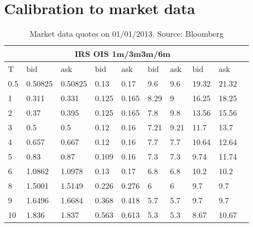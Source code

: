 \documentclass[12pt,a4paper]{article}
\theoremstyle{plain}
\numberwithin{equation}{section}
\begin{document}
\section{Calibration to market data}\label{calsec}
\begin{table}[t]
\begin{center}
\begin{tabular}{|l|l|l|l|l|l|l|l|l|l|}
\hline
\multicolumn{9}{|c|}{\;\;\;\;\;\;\;\;\;\;\;\;\;\;\;IRS \;\;\;\;\;\;\;\; \;\;\;\;\;\;\;\;\;\;\;\;OIS \;\;\;\;\;\;\;\;\;\;\;\;1m/3m\;\;\;\;\;\;\;\;\;\;\;\;\;3m/6m} \\\hline
T& bid& ask& bid& ask& bid& ask& bid& ask\\ \hline
0.5   & 0.50825 & 0.50825 & 0.13  & 0.17  & 9.6   & 9.6   & 19.32 & 21.32 \\
    1     & 0.311 & 0.331 & 0.125 & 0.165 & 8.29  & 9     & 16.25 & 18.25 \\
    2     & 0.37  & 0.395 & 0.125 & 0.165 & 7.8   & 9.8   & 13.56 & 15.56 \\
    3     & 0.5   & 0.5   & 0.12  & 0.16  & 7.21  & 9.21  & 11.7  & 13.7 \\
    4     & 0.657 & 0.667 & 0.12  & 0.16  & 7.7   & 7.7   & 10.64 & 12.64 \\
    5     & 0.83  & 0.87  & 0.109 & 0.16  & 7.3   & 7.3   & 9.74  & 11.74 \\
    6     & 1.0862 & 1.0978 & 0.13  & 0.17  & 6.8   & 6.8   & 10.2  & 10.2 \\
    8     & 1.5001 & 1.5149 & 0.226 & 0.276 & 6     & 6     & 9.7   & 9.7 \\
    9     & 1.6496 & 1.6684 & 0.368 & 0.418 & 5.7   & 5.7   & 9.7   & 9.7 \\
    10    & 1.836 & 1.837 & 0.563 & 0.613 & 5.3   & 5.3   & 8.67  & 10.67 \\
\hline
\end{tabular}\\[1ex]
\caption{Market data quotes on 01/01/2013. Source: Bloomberg }\label{Marketdata:20130101}
\end{center}
\end{table}
\end{document}
